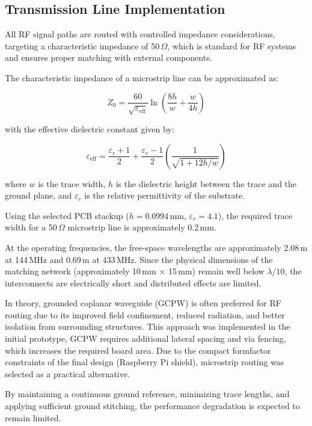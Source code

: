 \subsection{Transmission Line Implementation}

All RF signal paths are routed with controlled impedance considerations, targeting a characteristic impedance of 50\,$\Omega$, which is standard for RF systems and ensures proper matching with external components.

The characteristic impedance of a microstrip line can be approximated as:

\begin{equation}
Z_0 = \frac{60}{\sqrt{\varepsilon_{\text{eff}}}} 
\ln \left( \frac{8h}{w} + \frac{w}{4h} \right)
\end{equation}

with the effective dielectric constant given by:

\begin{equation}
\varepsilon_{\text{eff}} = \frac{\varepsilon_r + 1}{2} 
+ \frac{\varepsilon_r - 1}{2} 
\left( \frac{1}{\sqrt{1 + 12h/w}} \right)
\end{equation}

where $w$ is the trace width, $h$ is the dielectric height between the trace and the ground plane, and $\varepsilon_r$ is the relative permittivity of the substrate.

Using the selected PCB stackup ($h = 0.0994$\,mm, $\varepsilon_r = 4.1$), the required trace width for a 50\,$\Omega$ microstrip line is approximately 0.2\,mm. 

At the operating frequencies, the free-space wavelengths are approximately 2.08\,m at 144\,MHz and 0.69\,m at 433\,MHz. Since the physical dimensions of the matching network (approximately 10\,mm $\times$ 15\,mm) remain well below $\lambda/10$, the interconnects are electrically short and distributed effects are limited. 

In theory, grounded coplanar waveguide (GCPW) is often preferred for RF routing due to its improved field confinement, reduced radiation, and better isolation from surrounding structures. This approach was implemented in the initial prototype, GCPW requires additional lateral spacing and via fencing, which increases the required board area. Due to the compact formfactor constraints of the final design (Raspberry Pi shield), microstrip routing was selected as a practical alternative.

By maintaining a continuous ground reference, minimizing trace lengths, and applying sufficient ground stitching, the performance degradation is expected to remain limited.

